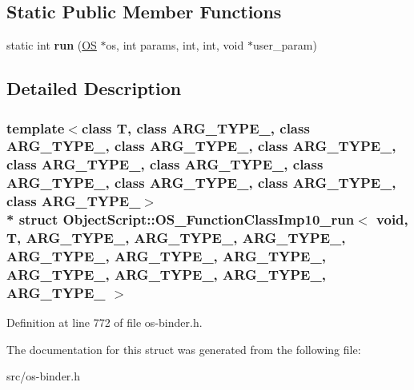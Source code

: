 \subsection*{Static Public Member Functions}
\begin{DoxyCompactItemize}
\item 
static int {\bfseries run} (\hyperlink{class_object_script_1_1_o_s}{OS} $\ast$os, int params, int, int, void $\ast$user\+\_\+param)\hypertarget{struct_object_script_1_1_o_s___function_class_imp10__run_3_01void_00_01_t_00_01_01_01_a_r_g___t_457cbbca4fb8695635ed4d7028248ff9_a6826c5dc3abed18a745769cadc090c8a}{}\label{struct_object_script_1_1_o_s___function_class_imp10__run_3_01void_00_01_t_00_01_01_01_a_r_g___t_457cbbca4fb8695635ed4d7028248ff9_a6826c5dc3abed18a745769cadc090c8a}

\end{DoxyCompactItemize}


\subsection{Detailed Description}
\subsubsection*{template$<$class T, class A\+R\+G\+\_\+\+T\+Y\+P\+E\+\_, class A\+R\+G\+\_\+\+T\+Y\+P\+E\+\_, class A\+R\+G\+\_\+\+T\+Y\+P\+E\+\_, class A\+R\+G\+\_\+\+T\+Y\+P\+E\+\_, class A\+R\+G\+\_\+\+T\+Y\+P\+E\+\_, class A\+R\+G\+\_\+\+T\+Y\+P\+E\+\_, class A\+R\+G\+\_\+\+T\+Y\+P\+E\+\_, class A\+R\+G\+\_\+\+T\+Y\+P\+E\+\_, class A\+R\+G\+\_\+\+T\+Y\+P\+E\+\_, class A\+R\+G\+\_\+\+T\+Y\+P\+E\+\_$>$\\*
struct Object\+Script\+::\+O\+S\+\_\+\+Function\+Class\+Imp10\+\_\+run$<$ void, T,   A\+R\+G\+\_\+\+T\+Y\+P\+E\+\_, A\+R\+G\+\_\+\+T\+Y\+P\+E\+\_, A\+R\+G\+\_\+\+T\+Y\+P\+E\+\_, A\+R\+G\+\_\+\+T\+Y\+P\+E\+\_, A\+R\+G\+\_\+\+T\+Y\+P\+E\+\_, A\+R\+G\+\_\+\+T\+Y\+P\+E\+\_, A\+R\+G\+\_\+\+T\+Y\+P\+E\+\_, A\+R\+G\+\_\+\+T\+Y\+P\+E\+\_, A\+R\+G\+\_\+\+T\+Y\+P\+E\+\_, A\+R\+G\+\_\+\+T\+Y\+P\+E\+\_ $>$}



Definition at line 772 of file os-\/binder.\+h.



The documentation for this struct was generated from the following file\+:\begin{DoxyCompactItemize}
\item 
src/os-\/binder.\+h\end{DoxyCompactItemize}
